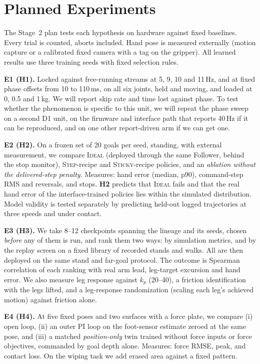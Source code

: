 \documentclass[conference]{IEEEtran}
\newcommand{\hyp}[1]{\textbf{H#1}}
\begin{document}
\section{Planned Experiments}
\label{sec:plan}

The Stage~2 plan tests each hypothesis on hardware against fixed baselines. Every trial is counted, aborts included. Hand
pose is measured externally (motion capture or a calibrated fixed camera with a tag on the gripper). All learned
results use three training seeds with fixed selection rules.

\textbf{E1 (\hyp{1}).} Locked against free-running streams at 5, 9, 10 and 11\,Hz, and at fixed phase offsets from 10 to
110\,ms, on all six joints, held and moving, and loaded at 0, 0.5 and 1\,kg. We will report skip rate and time lost
against phase. To test whether the phenomenon is specific to this unit, we will repeat the phase sweep on a second D1
unit, on the firmware and interface path that reports 40\,Hz \citep{schperberg2026safe} if it can be reproduced, and on
one other report-driven arm if we can get one.

\textbf{E2 (\hyp{2}).} On a frozen set of 20 goals per seed, standing, with external measurement, we compare
\textsc{Ideal} (deployed through the same Follower, behind the stop monitor), \textsc{Step}-recipe and
\textsc{Sticky}-recipe policies, and an \emph{ablation without the delivered-step penalty}. Measures: hand error
(median, p90), command-step RMS and reversals, and stops. \hyp{2} predicts that \textsc{Ideal} fails and that the real hand
error of the interface-trained policies lies within the simulated distribution. Model validity is tested separately by
predicting held-out logged trajectories at three speeds and under contact.

\textbf{E3 (\hyp{3}).} We take 8--12 checkpoints spanning the lineage and its seeds, chosen \emph{before} any of them is
run, and rank them two ways: by simulation metrics, and by the replay screen on a fixed library of recorded stands and
walks. All are then deployed on the same stand and far-goal protocol. The outcome is Spearman correlation of each ranking
with real arm lead, leg-target excursion and hand error. We also measure leg response against $k_p$ (20--40), a
friction identification with the legs lifted, and a leg-response randomization (scaling each leg's achieved motion)
against friction alone.

\textbf{E4 (\hyp{4}).} At five fixed poses and two surfaces with a force plate, we compare (i) open loop, (ii) an outer PI
loop on the foot-sensor estimate zeroed at the same pose, and (iii) a matched \emph{position-only} twin trained without
force inputs or force objectives, commanded by goal depth alone. Measures: force RMSE, peak, and contact loss. On
the wiping task we add erased area against a fixed pattern.
\end{document}
